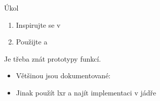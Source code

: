 \begin{frame}{Úkol}

  \begin{enumerate}
    \item Inspirujte se v 
    \item Použijte  a 
  \end{enumerate}

  \medskip

  Je třeba znát prototypy funkcí.
  \begin{itemize}
    \item Většinou jsou dokumentované: 
    \item Jinak použít lxr a najít implementaci v jádře
  \end{itemize}

\end{frame}

